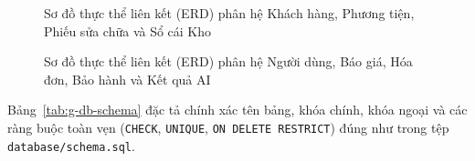 \begin{figure}[H]
\centering
\vspace{2pt}

\vspace{2pt}
\caption{Sơ đồ thực thể liên kết (ERD) phân hệ Khách hàng, Phương tiện, Phiếu sửa chữa và Sổ cái Kho}
\label{fig:g-erd-core}
\end{figure}

\begin{figure}[H]
\centering
\vspace{2pt}

\vspace{2pt}
\caption{Sơ đồ thực thể liên kết (ERD) phân hệ Người dùng, Báo giá, Hóa đơn, Bảo hành và Kết quả AI}
\label{fig:g-erd-ops}
\end{figure}

Bảng~\ref{tab:g-db-schema} đặc tả chính xác tên bảng, khóa chính, khóa ngoại và các ràng buộc toàn vẹn (\texttt{CHECK}, \texttt{UNIQUE}, \texttt{ON DELETE RESTRICT}) đúng như trong tệp \texttt{database/schema.sql}.

